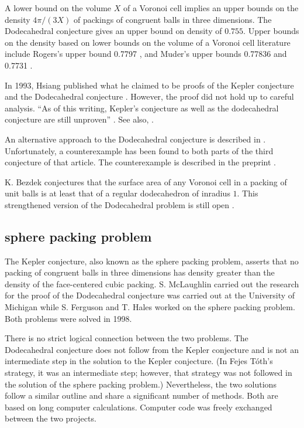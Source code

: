 A lower bound on the volume $X$ of a Voronoi cell implies
an upper bounds on the density $4\pi/(3X)$ of packings of congruent balls
in three dimensions. The Dodecahedral conjecture gives an upper
bound on density of $0.755$.  
Upper bounds on the density based on lower bounds on the volume of a Voronoi cell
literature include Rogers's upper bound 0.7797 \cite{Rogers}, and Muder's upper 
bounds 0.77836 \cite{Muder1} and 0.7731 \cite{Muder2}. 

In 1993, Hsiang published what he claimed to be proofs of the Kepler
conjecture and the Dodecahedral conjecture \cite{Hsiang}.
However, the proof did not hold up to careful analysis.  ``As of this
writing, Kepler's conjecture as well as the dodecahedral conjecture
are still unproven'' \cite[p761]{Bezdek}.  See also, \cite{Hal94}.

An alternative approach to the Dodecahedral conjecture is described
in \cite{Bezdek}.  Unfortunately, a counterexample has been found to
both parts of the third conjecture of that article.  The counterexample
is described in the preprint  \cite{arx}. 


K. Bezdek conjectures that the surface area of any Voronoi cell in a packing
of unit balls is at least that of a regular dodecahedron of inradius $1$.
This strengthened version of the Dodecahedral problem is still
open \cite{Bez04}.   



\subsection{sphere packing problem}

The Kepler conjecture, also known as the sphere packing problem, 
asserts that no packing of congruent balls
in three dimensions has density greater than the density of the
face-centered cubic packing.  
S. McLaughlin carried out 
the research for the proof of the Dodecahedral conjecture 
was carried out at the University
of Michigan while S. Ferguson and T. Hales worked on the sphere packing problem.  Both
problems were solved in 1998.  

There is no strict logical connection between the two problems.
The Dodecahedral conjecture does not follow from the Kepler conjecture
and is not an intermediate step in the solution to the Kepler conjecture.
(In Fejes T\'oth's strategy, it was an intermediate step; however, that
strategy was not followed in the solution of the sphere packing problem.)
Nevertheless,
the two solutions follow a similar outline and share a significant number of 
methods.
Both are based 
on long computer calculations.  Computer
code was freely exchanged between the two projects.

